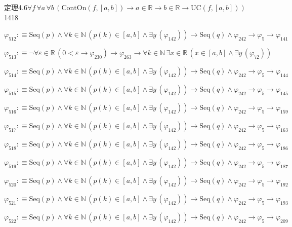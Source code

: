 \begin{fullproof}{定理4.6}{$\forall f\,\forall a\,\forall b\,(\mathrm{ContOn}(f,[a,b]) \to a \in \mathbb{R} \to b \in \mathbb{R} \to \mathrm{UC}(f,[a,b]))$}{1418}
\begin{abbrevlist}
\item $\varphi_{512} :\equiv \mathrm{Seq}(p) \land \forall k \in \mathbb{N}\,(p(k) \in [a,b] \land \exists y\,(\varphi_{142})) \to \mathrm{Seq}(q) \land \varphi_{242} \to \varphi_{5} \to \varphi_{141}$
\item $\varphi_{513} :\equiv \neg \forall \varepsilon \in \mathbb{R}\,(0 < \varepsilon \to \varphi_{230}) \to \varphi_{263} \to \forall k \in \mathbb{N}\,\exists x \in \mathbb{R}\,(x \in [a,b] \land \exists y\,(\varphi_{72}))$
\item $\varphi_{514} :\equiv \mathrm{Seq}(p) \land \forall k \in \mathbb{N}\,(p(k) \in [a,b] \land \exists y\,(\varphi_{142})) \to \mathrm{Seq}(q) \land \varphi_{242} \to \varphi_{5} \to \varphi_{144}$
\item $\varphi_{515} :\equiv \mathrm{Seq}(p) \land \forall k \in \mathbb{N}\,(p(k) \in [a,b] \land \exists y\,(\varphi_{142})) \to \mathrm{Seq}(q) \land \varphi_{242} \to \varphi_{5} \to \varphi_{145}$
\item $\varphi_{516} :\equiv \mathrm{Seq}(p) \land \forall k \in \mathbb{N}\,(p(k) \in [a,b] \land \exists y\,(\varphi_{142})) \to \mathrm{Seq}(q) \land \varphi_{242} \to \varphi_{5} \to \varphi_{159}$
\item $\varphi_{517} :\equiv \mathrm{Seq}(p) \land \forall k \in \mathbb{N}\,(p(k) \in [a,b] \land \exists y\,(\varphi_{142})) \to \mathrm{Seq}(q) \land \varphi_{242} \to \varphi_{5} \to \varphi_{163}$
\item $\varphi_{518} :\equiv \mathrm{Seq}(p) \land \forall k \in \mathbb{N}\,(p(k) \in [a,b] \land \exists y\,(\varphi_{142})) \to \mathrm{Seq}(q) \land \varphi_{242} \to \varphi_{5} \to \varphi_{186}$
\item $\varphi_{519} :\equiv \mathrm{Seq}(p) \land \forall k \in \mathbb{N}\,(p(k) \in [a,b] \land \exists y\,(\varphi_{142})) \to \mathrm{Seq}(q) \land \varphi_{242} \to \varphi_{5} \to \varphi_{187}$
\item $\varphi_{520} :\equiv \mathrm{Seq}(p) \land \forall k \in \mathbb{N}\,(p(k) \in [a,b] \land \exists y\,(\varphi_{142})) \to \mathrm{Seq}(q) \land \varphi_{242} \to \varphi_{5} \to \varphi_{192}$
\item $\varphi_{521} :\equiv \mathrm{Seq}(p) \land \forall k \in \mathbb{N}\,(p(k) \in [a,b] \land \exists y\,(\varphi_{142})) \to \mathrm{Seq}(q) \land \varphi_{242} \to \varphi_{5} \to \varphi_{193}$
\item $\varphi_{522} :\equiv \mathrm{Seq}(p) \land \forall k \in \mathbb{N}\,(p(k) \in [a,b] \land \exists y\,(\varphi_{142})) \to \mathrm{Seq}(q) \land \varphi_{242} \to \varphi_{5} \to \varphi_{209}$

\end{abbrevlist}
\end{fullproof}
